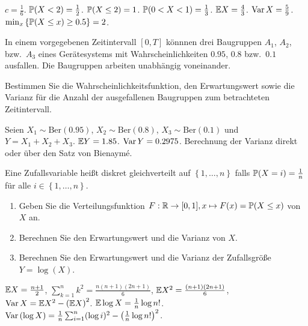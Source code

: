 \solution $c=\frac{1}{6}$. $\mathbb P(X<2)=\frac{1}{2}$. $\mathbb P(X\leq 2)=1$.
$\mathbb P(0<X<1)=\frac{1}{3}$. $\mathbb E X=\frac{4}{3}$. $\operatorname{Var} X = \frac{5}{9}$.
$\min_{x} \left\{ \mathbb P(X\leq x) \geq 0.5 \right\}=2$.


In einem vorgegebenen Zeitintervall $[0,T]$ könnnen drei Baugruppen $A_1$,
$A_2$, bzw.\ $A_3$ eines Gerätesystems mit Wahrscheinlichkeiten $0.95$, $0.8$
bzw.\ $0.1$ ausfallen. Die Baugruppen arbeiten unabhängig voneinander. 

Bestimmen Sie die Wahrscheinlichkeitsfunktion, den Erwartungswert sowie die
Varianz für die Anzahl der ausgefallenen Baugruppen zum betrachteten
Zeitintervall.

\solution
Seien $X_1 \sim \text{Ber}(0.95)$, $X_2 \sim \text{Ber}(0.8)$, $X_3 \sim
\text{Ber}(0.1)$ und $Y=X_1+X_2+X_3$. $\mathbb E Y = 1.85$. $\operatorname{Var} Y = 0.2975$.
Berechnung der Varianz direkt oder über den Satz von Bienaym\'e.


 Eine Zufallsvariable heißt
diskret gleichverteilt auf $\left\{ 1,\dots ,n \right\}$ falls
$\mathbb P(X=i)=\frac{1}{n}$ für alle $i\in\left\{ 1,\dots ,n \right\}$.
\begin{enumerate}
    \item Geben Sie die Verteilungsfunktion $F: \mathbb R\to [0,1], x\mapsto F(x) =
        \mathbb P(X \leq x)$ von $X$ an.

    \item Berechnen Sie den Erwartungswert und die Varianz von $X$. 

    \item Berechnen Sie den Erwartungswert und die Varianz der Zufallsgröße
        $Y = \log\left( X \right)$.

\end{enumerate}

\solution
$\mathbb E X = \frac{n+1}{2}$, $\sum_{k=1}^{n} k^2 = \frac{n(n+1)(2n+1)}{6}$,
$\mathbb E X^2 = \frac{(n+1)(2n+1)}{6}$, $\operatorname{Var} X = \mathbb E X^2 - \left( \mathbb E X \right)^2$.
$\mathbb E \log X = \frac{1}{n} \log n!$.
$\operatorname{Var} \left( \log X \right) = \frac{1}{n} \sum_{i=1}^{n} (\log i)^{2} - \left( \frac{1}{n} \log n! \right)^{2}$. 




